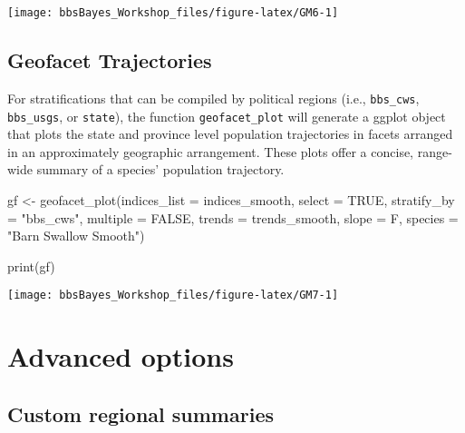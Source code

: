 \documentclass[
]{book}
\newenvironment{Shaded}{\begin{snugshade}}{\end{snugshade}}
\newcommand{\AttributeTok}[1]{\textcolor[rgb]{0.77,0.63,0.00}{#1}}
\newcommand{\ConstantTok}[1]{\textcolor[rgb]{0.00,0.00,0.00}{#1}}
\newcommand{\FunctionTok}[1]{\textcolor[rgb]{0.00,0.00,0.00}{#1}}
\newcommand{\NormalTok}[1]{#1}
\newcommand{\OtherTok}[1]{\textcolor[rgb]{0.56,0.35,0.01}{#1}}
\newcommand{\StringTok}[1]{\textcolor[rgb]{0.31,0.60,0.02}{#1}}
\begin{document}
\begin{center}\texttt{[image: bbsBayes\_Workshop\_files/figure-latex/GM6-1]} \end{center}

\hypertarget{geofacet-trajectories}{%
\section{Geofacet Trajectories}\label{geofacet-trajectories}}

For stratifications that can be compiled by political regions (i.e., \texttt{bbs\_cws}, \texttt{bbs\_usgs}, or \texttt{state}), the function \texttt{geofacet\_plot} will generate a ggplot object that plots the state and province level population trajectories in facets arranged in an approximately geographic arrangement. These plots offer a concise, range-wide summary of a species' population trajectory.

\begin{Shaded}
\begin{Highlighting}[]
\NormalTok{  gf }\OtherTok{\textless{}{-}} \FunctionTok{geofacet\_plot}\NormalTok{(}\AttributeTok{indices\_list =}\NormalTok{ indices\_smooth,}
                     \AttributeTok{select =} \ConstantTok{TRUE}\NormalTok{,}
                     \AttributeTok{stratify\_by =} \StringTok{"bbs\_cws"}\NormalTok{,}
                     \AttributeTok{multiple =} \ConstantTok{FALSE}\NormalTok{,}
                     \AttributeTok{trends =}\NormalTok{ trends\_smooth,}
                     \AttributeTok{slope =}\NormalTok{ F,}
                     \AttributeTok{species =} \StringTok{"Barn Swallow Smooth"}\NormalTok{)}
  
  \FunctionTok{print}\NormalTok{(gf)}
\end{Highlighting}
\end{Shaded}

\begin{center}\texttt{[image: bbsBayes\_Workshop\_files/figure-latex/GM7-1]} \end{center}

\hypertarget{Adv}{%
\chapter{Advanced options}\label{Adv}}

\hypertarget{custom-regional-summaries}{%
\section{Custom regional summaries}\label{custom-regional-summaries}}
\end{document}
